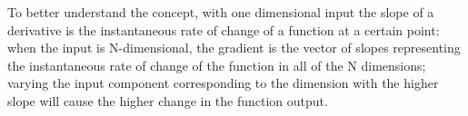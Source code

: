 \documentclass[../main.tex]{subfiles}
\begin{document}
To better understand the concept, with one dimensional input the slope of a derivative is the instantaneous rate of change of a function at a certain point: when the input is N-dimensional, the gradient is the vector of slopes representing the instantaneous rate of change of the function in all of the N dimensions; varying the input component corresponding to the dimension with the higher slope will cause the higher change in the function output.

\vspace{5mm}
\end{document}
